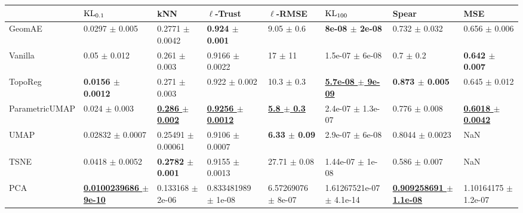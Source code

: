 \begin{tabular}{llllllll}
\toprule
{} &                                    $\operatorname{KL}_{0.1}$ &                                      kNN &                               $\ell$-Trust &                          $\ell$-RMSE &                               $\operatorname{KL}_{100}$ &                                            Spear &                                        MSE \\
\midrule
GeomAE         &                              0.0297 $\pm$ 0.005 &                      0.2771 $\pm$ 0.0042 &                 \textbf{0.924 $\pm$ 0.001} &                       9.05 $\pm$ 0.6 &                 \textbf{8e-08 $\pm$ 2e-08} &                                0.732 $\pm$ 0.032 &                          0.656 $\pm$ 0.006 \\
Vanilla        &                                0.05 $\pm$ 0.012 &                        0.261 $\pm$ 0.003 &                        0.9166 $\pm$ 0.0022 &                          17 $\pm$ 11 &                        1.5e-07 $\pm$ 6e-08 &                                    0.7 $\pm$ 0.2 &                 \textbf{0.642 $\pm$ 0.007} \\
TopoReg        &                    \textbf{0.0156 $\pm$ 0.0012} &                        0.271 $\pm$ 0.003 &                          0.922 $\pm$ 0.002 &                       10.3 $\pm$ 0.3 &   \underline{\textbf{5.7e-08 $\pm$ 9e-09}} &                       \textbf{0.873 $\pm$ 0.005} &                          0.645 $\pm$ 0.012 \\
ParametricUMAP &                               0.024 $\pm$ 0.003 &   \underline{\textbf{0.286 $\pm$ 0.002}} &   \underline{\textbf{0.9256 $\pm$ 0.0012}} &   \underline{\textbf{5.8 $\pm$ 0.3}} &                      2.4e-07 $\pm$ 1.3e-07 &                                0.776 $\pm$ 0.008 &   \underline{\textbf{0.6018 $\pm$ 0.0042}} \\
UMAP           &                            0.02832 $\pm$ 0.0007 &                    0.25491 $\pm$ 0.00061 &                        0.9106 $\pm$ 0.0007 &             \textbf{6.33 $\pm$ 0.09} &                        2.9e-07 $\pm$ 6e-08 &                              0.8044 $\pm$ 0.0023 &                                        NaN \\
TSNE           &                             0.0418 $\pm$ 0.0052 &              \textbf{0.2782 $\pm$ 0.001} &                        0.9155 $\pm$ 0.0013 &                     27.71 $\pm$ 0.08 &                       1.44e-07 $\pm$ 1e-08 &                                0.586 $\pm$ 0.007 &                                        NaN \\
PCA            &   \underline{\textbf{0.0100239686 $\pm$ 9e-10}} &                     0.133168 $\pm$ 2e-06 &                    0.833481989 $\pm$ 1e-08 &               6.57269076 $\pm$ 8e-07 &               1.61267521e-07 $\pm$ 4.1e-14 &   \underline{\textbf{0.909258691 $\pm$ 1.1e-08}} &                   1.10164175 $\pm$ 1.2e-07 \\
\bottomrule
\end{tabular}
